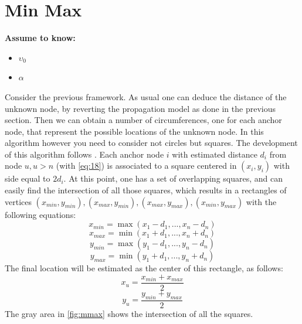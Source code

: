 \documentclass[12pt,twoside]{report}
\begin{document}
\section{Min Max}
  \begin{center}
  \textbf{Assume to know:}
  \begin{itemize}
    \centering
    \item $\upsilon_0$
    \item $\alpha$
  \end{itemize}
  \end{center}
Consider the previous framework. As usual one can deduce the distance of the unknown node, by reverting the propagation model as done in the previous section. Then we can obtain a number of circumferences, one for each anchor node, that represent the possible locations of the unknown node. In this algorithm however you need to consider not circles but squares. The development of this algorithm follows \cite{inproceedings}. Each anchor node $i$ with estimated distance $d_i$ from node $u,u>n$ (with \ref{eq:18}) is associated to a square centered in $(x_i,y_i)$ with side equal to $2d_i$. At this point, one has a set of overlapping squares, and can easily find the intersection of all those squares,  which results in a rectangles of vertices $(x_{min},y_{min}), (x_{max},y_{min}), (x_{max},y_{max}), (x_{min},y_{max})$ with the following equations:
\begin{equation}
    x_{min}=\max(x_1-d_1,...,x_n-d_n)
\end{equation}
\begin{equation}
    x_{max}=\min(x_1+d_1,...,x_n+d_n)
\end{equation}
\begin{equation}
    y_{min}=\max(y_1-d_1,...,y_n-d_n)
\end{equation}
\begin{equation}
    y_{max}=\min(y_1+d_1,...,y_n+d_n)
\end{equation}
The final location will be estimated as the center of this rectangle, as follows:
\begin{equation}
    x_u=\frac{x_{min}+x_{max}}{2}
\end{equation}
\begin{equation}
    y_u=\frac{y_{min}+y_{max}}{2}
\end{equation}
The gray area in \ref{fig:mmax} shows the intersection of all the squares.
\end{document}
